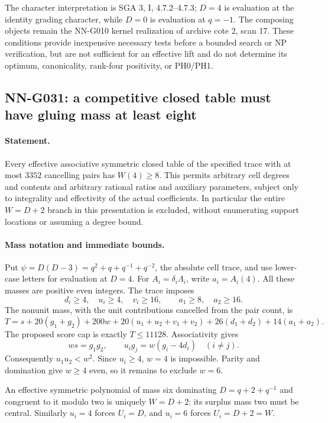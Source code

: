 The character interpretation is SGA 3, I, 4.7.2--4.7.3;
$D=4$ is evaluation at the identity grading character,
while $D=0$ is evaluation at $q=-1$.
The composing objects remain the NN-G010 kernel
realization of archive cote 2, scan 17. These conditions
provide inexpensive necessary tests before a bounded
search or NP verification, but are not sufficient for
an effective lift and do not determine its optimum,
canonicality, rank-four positivity, or PH0/PH1.

\subsection{NN-G031: a competitive closed table must have gluing mass at least eight}
\paragraph{Statement.}
Every effective associative symmetric closed table of the specified trace
with at most $3352$ cancelling pairs has $W(4)\ge8$.
This permits arbitrary cell degrees and contents and arbitrary
rational ratios and auxiliary parameters, subject only to
integrality and effectivity of the actual coefficients.
In particular the entire $W=D+2$ branch in this presentation is excluded, without
enumerating support locations or assuming a degree bound.

\paragraph{Mass notation and immediate bounds.}
Put $\psi=D(D-3)=q^2+q+q^{-1}+q^{-2}$, the absolute
cell trace, and use lower-case letters for evaluation at $D=4$.
For $A_i=\delta_i\Lambda_i$, write $a_i=A_i(4)$.
All these masses are positive even integers. The trace imposes
\[
 d_i\ge4,\quad u_i\ge4,\quad v_i\ge16,\qquad
 a_1\ge8,\quad a_2\ge16.
\]
The nonunit mass, with the unit contributions cancelled from
the pair count, is
\[
 T=s+20(g_1+g_2)+200w+20(u_1+u_2+v_1+v_2)
       +26(d_1+d_2)+14(a_1+a_2).                    \tag{G031.1}
\]
The proposed score cap is exactly $T\le11128$.
Associativity gives
\[
 ws=g_1g_2,\qquad u_i g_j=w(g_i-4d_i)\quad(i\ne j).
                                                               \tag{G031.2}
\]
Consequently $u_1u_2<w^2$. Since $u_i\ge4$, $w=4$
is impossible. Parity and domination give $w\ge4$ even,
so it remains to exclude $w=6$.

An effective symmetric polynomial of mass six dominating
$D=q+2+q^{-1}$ and congruent to it modulo two is uniquely
$W=D+2$: its surplus mass two must be central.
Similarly $u_i=4$ forces $U_i=D$, and $u_i=6$ forces
$U_i=D+2=W$.

